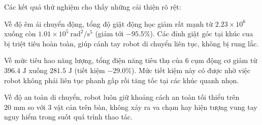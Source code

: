 \begin{table}[htbp]
\centering
\caption{Bảng so sánh định lượng các chỉ số chất lượng giữa phương pháp gốc và phương pháp đề xuất}
\label{tab:benchmark_metrics_nature}
\end{table}

Các kết quả thử nghiệm cho thấy những cải thiện rõ rệt:

Về độ êm ái chuyển động, tổng độ giật động học giảm rất mạnh từ $2.23 \times 10^6$ xuống còn $1.01 \times 10^5\ \text{rad}^2/\text{s}^5$ (giảm tới $-95.5\%$). Các đỉnh giật góc tại khúc cua bị triệt tiêu hoàn toàn, giúp cánh tay robot di chuyển liên tục, không bị rung lắc.

Về mức tiêu hao năng lượng, tổng điện năng tiêu thụ của 6 cụm động cơ giảm từ $396.4\text{ J}$ xuống $281.5\text{ J}$ (tiết kiệm $-29.0\%$). Mức tiết kiệm này có được nhờ việc robot không phải liên tục phanh gấp rồi tăng tốc tại các khúc quanh nhọn.

Về độ an toàn di chuyển, robot luôn giữ khoảng cách an toàn tối thiểu trên $20\text{ mm}$ so với 3 vật cản trên bàn, không xảy ra va chạm hay hiện tượng vung tay nguy hiểm trong suốt quá trình thao tác.
